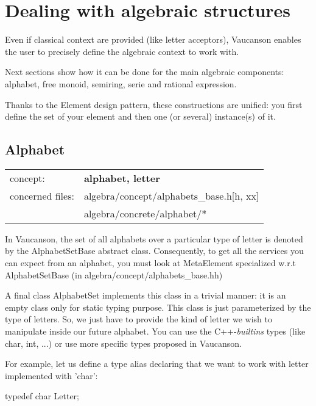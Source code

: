 \documentclass{article}
\begin{document}
\section{Dealing with algebraic structures}

Even if classical context are provided (like letter acceptors),
Vaucanson enables the user to precisely define the algebraic context
to work with. 

Next sections show how it can be done for the main algebraic
components: alphabet, free monoid, semiring, serie and rational
expression.

Thanks to the Element design pattern, these constructions are unified:
you first define the set of your element and then one (or several)
instance(s) of it.

\subsection{Alphabet}

\begin{tabular}%
{ll}
\hline 
concept: & \textbf{alphabet, letter} \\
concerned files: & algebra/concept/alphabets\_base.h[h, xx] \\
                 & algebra/concrete/alphabet/* \\
\hline 
\end{tabular}

\hspace{1cm}

In Vaucanson, the set of all alphabets over a particular type of
letter is denoted by the AlphabetSetBase abstract class. Consequently,
to get all the services you can expect from an alphabet, you must look
at MetaElement specialized w.r.t AlphabetSetBase (in
algebra/concept/alphabets\_base.hh)

A final class AlphabetSet implements this class in a trivial manner:
it is an empty class only for static typing purpose. This class is
just parameterized by the type of letters. So, we just have to provide
the kind of letter we wish to manipulate inside our future alphabet.
You can use the C++-\textit{builtins} types (like char, int, ...)  or
use more specific types proposed in Vaucanson.

For example, let us define a type alias declaring that we want to work
with letter implemented with 'char':

\begin{code}
typedef char Letter;
\end{code}
\end{document}

